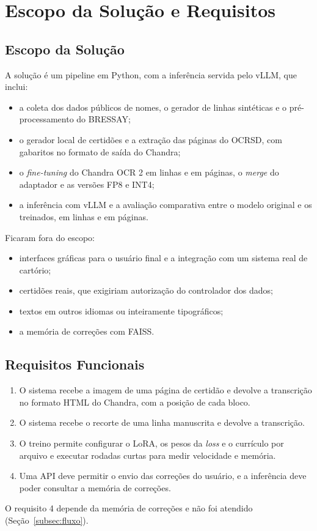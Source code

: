\section{Escopo da Solução e Requisitos}
\label{sec:escopo}

\subsection{Escopo da Solução}

A solução é um pipeline em Python, com a inferência servida pelo vLLM, que inclui:
\begin{itemize}
    \item a coleta dos dados públicos de nomes, o gerador de linhas sintéticas e o pré-processamento do BRESSAY;
    \item o gerador local de certidões e a extração das páginas do OCRSD, com gabaritos no formato de saída do Chandra;
    \item o \emph{fine-tuning} do Chandra OCR 2 em linhas e em páginas, o \emph{merge} do adaptador e as versões FP8 e INT4;
    \item a inferência com vLLM e a avaliação comparativa entre o modelo original e os treinados, em linhas e em páginas.
\end{itemize}

Ficaram fora do escopo:
\begin{itemize}
    \item interfaces gráficas para o usuário final e a integração com um sistema real de cartório;
    \item certidões reais, que exigiriam autorização do controlador dos dados;
    \item textos em outros idiomas ou inteiramente tipográficos;
    \item a memória de correções com FAISS.
\end{itemize}

\subsection{Requisitos Funcionais}

\begin{enumerate}
    \item O sistema recebe a imagem de uma página de certidão e devolve a transcrição no formato HTML do Chandra, com a posição de cada bloco.
    \item O sistema recebe o recorte de uma linha manuscrita e devolve a transcrição.
    \item O treino permite configurar o LoRA, os pesos da \emph{loss} e o currículo por arquivo e executar rodadas curtas para medir velocidade e memória.
    \item Uma API deve permitir o envio das correções do usuário, e a inferência deve poder consultar a memória de correções.
\end{enumerate}
O requisito 4 depende da memória de correções e não foi atendido (Seção~\ref{subsec:fluxo}).

